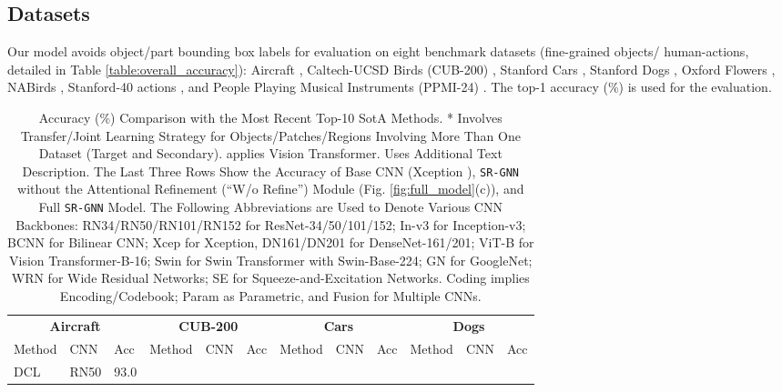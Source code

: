 \documentclass[journal]{IEEEtran}
\begin{document}
\subsection {Datasets}
Our model avoids object/part bounding box labels for evaluation on eight benchmark datasets (fine-grained objects/ human-actions, detailed in Table \ref{table:overall_accuracy}): Aircraft \cite{maji2013fine}, Caltech-UCSD Birds (CUB-200) \cite{wah2011caltech}, Stanford Cars \cite{krause20133d}, Stanford Dogs \cite{khosla2011novel}, Oxford Flowers  \cite{nilsback2008automated},  NABirds \cite{van2015building}, Stanford-40 actions \cite{yao2011human}, and People Playing Musical Instruments (PPMI-24) \cite{yao2010grouplet}. The top-1 accuracy (\%) is used for the evaluation. 


\begin{table*}[t]
 \centering
 \caption{Accuracy (\%) Comparison with the Most Recent Top-10 SotA Methods. {\color{magenta}*} Involves Transfer/Joint Learning Strategy for Objects/Patches/Regions Involving More Than One Dataset (Target and Secondary). {\color{orange}} applies Vision Transformer. {\color{green}} Uses Additional Text Description. The Last Three Rows Show the Accuracy of Base CNN (Xception \cite{chollet2017xception}), \texttt{SR-GNN} without the Attentional Refinement (``W/o Refine'') Module (Fig. \ref{fig:full_model}(c)), and Full \texttt{SR-GNN} Model. The Following Abbreviations are Used to Denote Various CNN Backbones: RN34/RN50/RN101/RN152 for ResNet-34/50/101/152; In-v3 for Inception-v3; BCNN for Bilinear CNN; Xcep for Xception, DN161/DN201 for DenseNet-161/201; ViT-B for Vision Transformer-B-16; Swin for Swin Transformer with Swin-Base-224; GN for GoogleNet; WRN for Wide Residual Networks; SE for Squeeze-and-Excitation Networks. Coding implies Encoding/Codebook; Param as Parametric, and Fusion for Multiple CNNs.}
  \label{table:sota_comp}  
 \begin{small}
  \begin{tabular}{|p{1.7 cm} p{8 mm} p{5 mm}|p{1.7 cm} p{8 mm} p{5 mm}|p{1.8 cm} p{8 mm} p{5 mm}|p{1.9 cm} p{13 mm} p{5 mm}|}
    \hline
      \multicolumn{3}{|c|}{\textbf{Aircraft}}&
      \multicolumn{3}{c|}{\textbf{CUB-200}}&
      \multicolumn{3}{c|}{\textbf{Cars}}&       
      \multicolumn{3}{c|}{\textbf{Dogs}} 
      \\
{Method} & {CNN} &  {Acc} & {Method} & {CNN} &  {Acc} & {Method} & {CNN} &  {Acc} & {Method} & {CNN} &  {Acc}   \\ 
      \hline 
DCL \cite{chen2019destruction} & RN50 & 93.0 & 

\end{tabular}
\end{small}
\end{table*}
\end{document}
